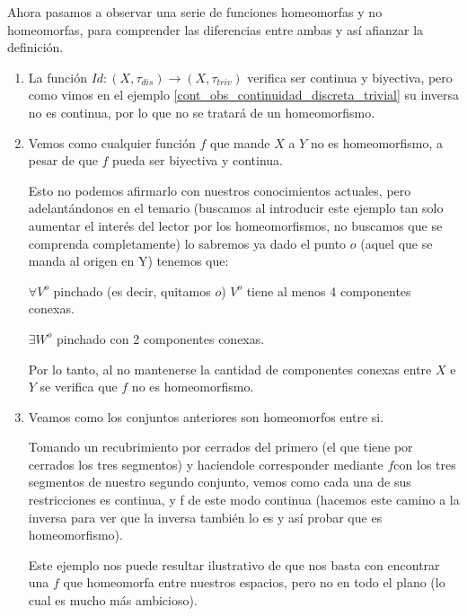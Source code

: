 Ahora pasamos a observar una serie de funciones homeomorfas y no homeomorfas, para comprender las diferencias entre ambas y así afianzar la definición.
\label{etop_exa_homeomorfismos}
\begin{exa}[Homeomorfismos]
	
	\begin{enumerate}
		\item La función $Id\colon(X,\tau_{dis})\rightarrow(X,\tau_{triv})$ verifica ser continua y biyectiva, pero como vimos en el ejemplo \ref{cont_obs_continuidad_discreta_trivial} su inversa no es continua, por lo que no se tratará de un homeomorfismo. 
		
		\item %
		Vemos como cualquier función $f$ que mande $X$ a $Y$ no es homeomorfismo, a pesar de que $f$ pueda ser biyectiva y continua.
		
		Esto no podemos afirmarlo con nuestros conocimientos actuales, pero adelantándonos en el temario (buscamos al introducir este ejemplo tan solo aumentar el interés del lector por los homeomorfismos, no buscamos que se comprenda completamente) lo sabremos ya dado el punto $o$ (aquel que se manda al origen en Y) tenemos que:
		
		$\forall V^o$ pinchado (es decir, quitamos $o$) $V^o$ tiene al menos 4 componentes conexas.%
		
		$\exists W^o$ pinchado  con 2 componentes conexas.%
		
		Por lo tanto, al no mantenerse la cantidad de componentes conexas entre $X$ e $Y$ se verifica que $f$ no es homeomorfismo.
		
		\item %
		Veamos como los conjuntos anteriores son homeomorfos entre si.
		
		 Tomando un recubrimiento por cerrados del primero (el que tiene por cerrados los tres segmentos) y haciendole corresponder mediante $f $con los tres segmentos de nuestro segundo conjunto, vemos como cada una de sus restricciones es continua, y f de este modo continua (hacemos este camino a la inversa para ver que la inversa también lo es y así probar que es homeomorfismo). 
		
		Este ejemplo nos puede resultar ilustrativo de que nos basta con encontrar una $f$ que homeomorfa entre nuestros espacios, pero no en todo el plano (lo cual es mucho más ambicioso).
	\end{enumerate}
\end{exa}

